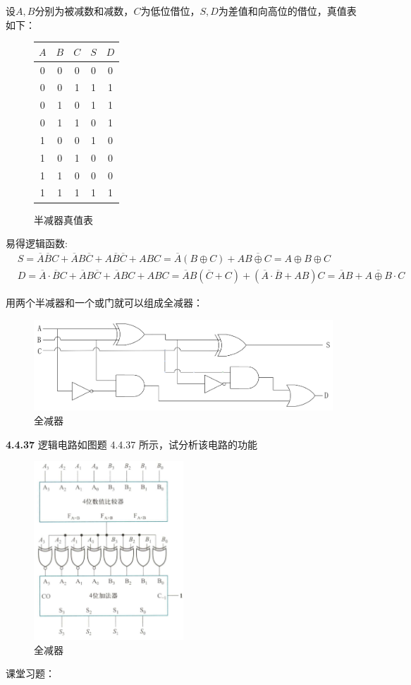 \documentclass[a4paper,11pt,UTF8]{article}
\begin{document}
设$A,B$分别为被减数和减数，$C$为低位借位，$S,D$为差值和向高位的借位，真值表如下：
\begin{figure}[H]
	\centering
	\begin{tabular}{ccc|cc}
		\hline
		$A$ & $B$ & $C$ & $S$ & $D$\\
		\hline
		0 & 0 & 0 & 0 & 0\\
		0 & 0 & 1 & 1 & 1\\
		0 & 1 & 0 & 1 & 1\\
		0 & 1 & 1 & 0 & 1\\
		1 & 0 & 0 & 1 & 0\\
		1 & 0 & 1 & 0 & 0\\
		1 & 1 & 0 & 0 & 0\\
		1 & 1 & 1 & 1 & 1\\
		\hline
	\end{tabular}
	\caption{半减器真值表}
\end{figure}
易得逻辑函数:
\begin{align*}
	&S=\overline{A}\overline{B}C+\overline{A}B\overline{C}+A\overline{B}\overline{C}+ABC=\overline{A}(B\oplus C)+A\overline{B\oplus C}=A\oplus B\oplus C \\
	&D=\overline{A}\cdot\overline{B}C+\overline{A}B\overline{C}+\overline{A}BC+ABC=\overline{A}B(\overline{C}+C)+(\overline{A}\cdot\overline{B}+AB)C=\overline{A}B+\overline{A\oplus B}\cdot C
\end{align*}

用两个半减器和一个或门就可以组成全减器：
\begin{figure}[H]
	\centering
	\includegraphics[width=1\textwidth]{4.4.35_2}
	\caption{全减器}
\end{figure}
\textbf{4.4.37} 逻辑电路如图题 4.4.37 所示，试分析该电路的功能
\begin{figure}[H]
	\centering
	\includegraphics[width=0.5\textwidth]{4.4.37}
	\caption{全减器}
\end{figure}
课堂习题：
\end{document}
